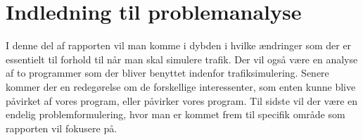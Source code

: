 
\chapter{Indledning til problemanalyse}
I denne del af rapporten vil man komme i dybden i hvilke ændringer som der er essentielt til forhold til når man skal simulere trafik. Der vil også være en analyse af to programmer som der bliver benyttet indenfor trafiksimulering. Senere kommer der en redegørelse om de forskellige interessenter, som enten kunne blive påvirket af vores program, eller påvirker vores program. Til sidste vil der være en endelig problemformulering, hvor man er kommet frem til specifik område som rapporten vil fokusere på.

